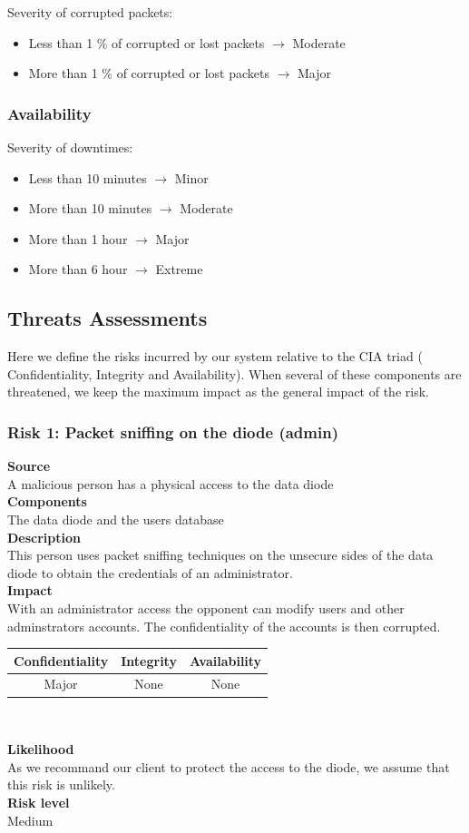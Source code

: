 \documentclass[a4paper,11pt]{article}
\begin{document}
Severity of corrupted packets:
\begin{itemize}
\item Less than 1 \% of corrupted or lost packets $\rightarrow$ Moderate
\item More than 1 \% of corrupted or lost packets $\rightarrow$ Major
\end{itemize}
\subsubsection{Availability}
Severity of downtimes:
\begin{itemize}
\item Less than 10 minutes $\rightarrow$ Minor
\item More than 10 minutes $\rightarrow$ Moderate
\item More than 1 hour $\rightarrow$ Major
\item More than 6 hour $\rightarrow$ Extreme
\end{itemize}
\subsection{Threats Assessments}
Here we define the risks incurred by our system relative to the CIA triad ( Confidentiality, Integrity and Availability). When several of these components are threatened, we keep the maximum impact as the general impact of the risk.
\subsubsection{Risk 1: Packet sniffing on the diode (admin) }
\textbf{Source} \\A malicious person has a physical access to the data diode\\
\textbf{Components} \\The data diode and the users database\\
\textbf{Description}\\ This person uses packet sniffing techniques on the unsecure sides of the data diode to obtain the credentials of an administrator. \\
\textbf{Impact}\\
With an administrator access the opponent can modify users and other adminstrators accounts. The confidentiality of the accounts is then corrupted.\\
\begin{center}

\begin{tabular}{|c|c|c|}
\hline
\textbf{Confidentiality} & \textbf{Integrity} & \textbf{Availability} \\
\hline
Major & None & None \\
\hline
\end{tabular}\\
\end{center}
\textbf{Likelihood}\\ As we recommand our client to protect the access to the diode, we assume that this risk is unlikely.\\
\textbf{Risk level}\\Medium\\
\end{document}
